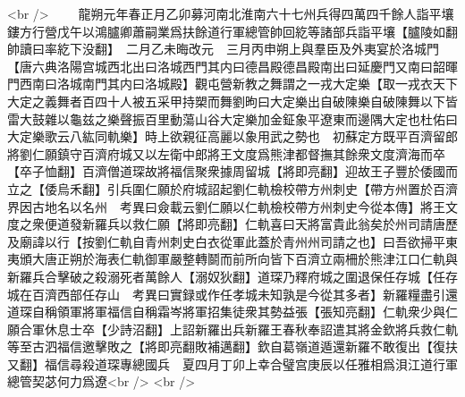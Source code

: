 <br />
　　龍朔元年春正月乙卯募河南北淮南六十七州兵得四萬四千餘人詣平壤鏤方行營戊午以鴻臚卿蕭嗣業爲扶餘道行軍總管帥回紇等諸部兵詣平壤【臚陵如翻帥讀曰率紇下没翻】　二月乙未晦改元　三月丙申朔上與羣臣及外夷宴於洛城門【唐六典洛陽宫城西北出曰洛城西門其内曰德昌殿德昌殿南出曰延慶門又南曰韶暉門西南曰洛城南門其内曰洛城殿】觀屯營新教之舞謂之一戎大定樂【取一戎衣天下大定之義舞者百四十人被五采甲持槊而舞劉昫曰大定樂出自破陳樂自破陳舞以下皆雷大鼓雜以龜兹之樂聲振百里動蕩山谷大定樂加金鉦象平遼東而邊隅大定也杜佑曰大定樂歌云八紘同軌樂】時上欲親征高麗以象用武之勢也　初蘇定方既平百濟留郎將劉仁願鎮守百濟府城又以左衛中郎將王文度爲熊津都督撫其餘衆文度濟海而卒【卒子恤翻】百濟僧道琛故將福信聚衆據周留城【將即亮翻】迎故王子豐於倭國而立之【倭烏禾翻】引兵圍仁願於府城詔起劉仁軌檢校帶方州刺史【帶方州置於百濟界因古地名以名州　考異曰僉載云劉仁願以仁軌檢校帶方州刺史今從本傳】將王文度之衆便道發新羅兵以救仁願【將即亮翻】仁軌喜曰天將富貴此翁矣於州司請唐歷及廟諱以行【按劉仁軌自青州刺史白衣從軍此蓋於青州州司請之也】曰吾欲掃平東夷頒大唐正朔於海表仁軌御軍嚴整轉鬬而前所向皆下百濟立兩柵於熊津江口仁軌與新羅兵合擊破之殺溺死者萬餘人【溺奴狄翻】道琛乃釋府城之圍退保任存城【任存城在百濟西部任存山　考異曰實録或作任孝城未知孰是今從其多者】新羅糧盡引還道琛自稱領軍將軍福信自稱霜岑將軍招集徒衆其勢益張【張知亮翻】仁軌衆少與仁願合軍休息士卒【少詩沼翻】上詔新羅出兵新羅王春秋奉詔遣其將金欽將兵救仁軌等至古泗福信邀擊敗之【將即亮翻敗補邁翻】欽自葛嶺道遁還新羅不敢復出【復扶又翻】福信尋殺道琛專總國兵　夏四月丁卯上幸合璧宫庚辰以任雅相爲浿江道行軍總管契苾何力爲遼<br />
<br />
